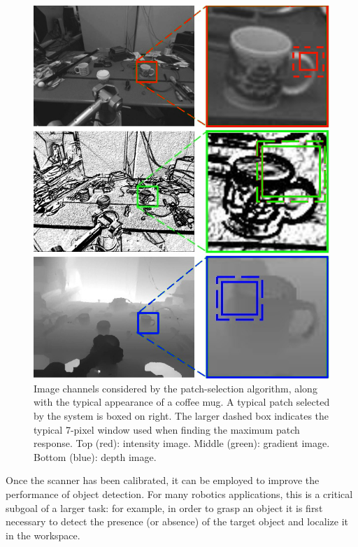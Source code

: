 \documentclass[letterpaper, 10 pt, conference]{ieeeconf}  %
\begin{document}
\begin{figure}[t]
\begin{center}
  \includegraphics[width=0.95\linewidth]{objdet_mod.png}
  \caption{Image channels considered by the patch-selection algorithm, along with the typical appearance of a coffee mug. A typical patch selected by the system is boxed on right. The larger dashed box indicates the typical 7-pixel window used when finding the maximum patch response. Top (red): intensity image. Middle (green): gradient image. Bottom (blue): depth image.}
  \label{fig:objdet}
\end{center}
\end{figure}


Once the scanner has been calibrated, it can be employed to improve the
performance of object detection. For many robotics applications, this is a
critical subgoal of a larger task: for example, in order to grasp an object it
is first necessary to detect the presence (or absence) of the target object and
localize it in the workspace.

\end{document}

